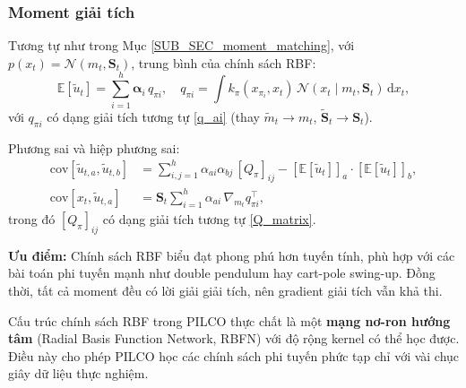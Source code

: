 \subsubsection{Moment giải tích}
\label{SUB_SUB_SEC_rbf_moments}

Tương tự như trong Mục \ref{SUB_SEC_moment_matching}, với $p(x_t) = \mathcal{N}(m_t, \mathbf{S}_t)$, trung bình của chính sách RBF:
\begin{equation}
    \mathbb{E}[\tilde{u}_t] = \sum_{i=1}^{h} \boldsymbol{\alpha}_i\, q_{\pi i},\quad q_{\pi i} = \int k_\pi(x_{\pi_i}, x_t)\, \mathcal{N}(x_t \mid m_t, \mathbf{S}_t)\, \mathrm{d}x_t,
    \label{rbf_mean}
\end{equation}
với $q_{\pi i}$ có dạng giải tích tương tự \eqref{q_ai} (thay $\tilde{m}_t \to m_t$, $\tilde{\mathbf{S}}_t \to \mathbf{S}_t$).

Phương sai và hiệp phương sai:
\begin{align}
    \mathrm{cov}[\tilde{u}_{t,a}, \tilde{u}_{t,b}] &= \sum_{i,j=1}^{h} \alpha_{ai}\alpha_{bj}\, [Q_\pi]_{ij} - [\mathbb{E}[\tilde{u}_t]]_a \cdot [\mathbb{E}[\tilde{u}_t]]_b, \label{rbf_cov} \\
    \mathrm{cov}[x_t, \tilde{u}_{t,a}] &= \mathbf{S}_t \sum_{i=1}^{h} \alpha_{ai}\, \nabla_{m_t} q_{\pi i}^\top, \label{rbf_cross_cov}
\end{align}
trong đó $[Q_\pi]_{ij}$ có dạng giải tích tương tự \eqref{Q_matrix}.

\textbf{Ưu điểm:} Chính sách RBF biểu đạt phong phú hơn tuyến tính, phù hợp với các bài toán phi tuyến mạnh như double pendulum hay cart-pole swing-up. Đồng thời, tất cả moment đều có lời giải giải tích, nên gradient giải tích vẫn khả thi.

\begin{nx}
    Cấu trúc chính sách RBF trong PILCO thực chất là một \textbf{mạng nơ-ron hướng tâm} (Radial Basis Function Network, RBFN) với độ rộng kernel có thể học được. Điều này cho phép PILCO học các chính sách phi tuyến phức tạp chỉ với vài chục giây dữ liệu thực nghiệm.
\end{nx}
\medskip
